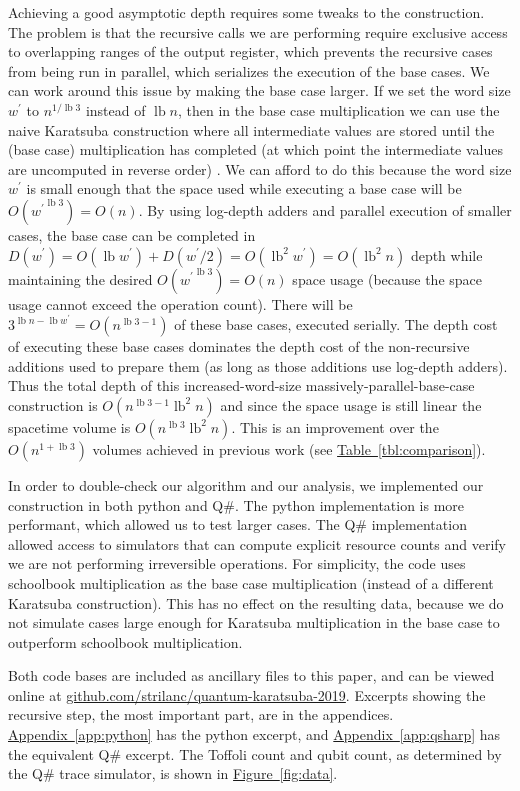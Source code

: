 \documentclass[onecolumn,unpublished]{quantumarticle}
\DeclareRobustCommand{\app}[1]{\hyperref[app:#1]{Appendix~\ref*{app:#1}}}
\newcommand{\fig}[1]{\hyperref[fig:#1]{Figure~\ref*{fig:#1}}}
\newcommand{\tbl}[1]{\hyperref[tbl:#1]{Table~\ref*{tbl:#1}}}
\def\lb{\operatorname{lb}}
\begin{document}
Achieving a good asymptotic depth requires some tweaks to the construction.
The problem is that the recursive calls we are performing require exclusive access to overlapping ranges of the output register, which prevents the recursive cases from being run in parallel, which serializes the execution of the base cases.
We can work around this issue by making the base case larger.
If we set the word size $w^\prime$ to $n^{1 / \lb 3}$ instead of $\lb n$, then in the base case multiplication we can use the naive Karatsuba construction where all intermediate values are stored until the (base case) multiplication has completed (at which point the intermediate values are uncomputed in reverse order) \cite{bennett1973logical}.
We can afford to do this because the word size $w^\prime$ is small enough that the space used while executing a base case will be $O({w^\prime}^{\lb 3}) = O(n)$.
By using log-depth adders and parallel execution of smaller cases, the base case can be completed in $D(w^\prime) = O(\lb w^\prime) + D(w^\prime/2) = O(\lb^2 w^\prime) = O(\lb^2 n)$ depth while maintaining the desired $O({w^\prime}^{\lb 3}) = O(n)$ space usage (because the space usage cannot exceed the operation count).
There will be $3^{\lb n - \lb w^\prime} = O(n^{\lb 3 - 1})$ of these base cases, executed serially.
The depth cost of executing these base cases dominates the depth cost of the non-recursive additions used to prepare them (as long as those additions use log-depth adders).
Thus the total depth of this increased-word-size massively-parallel-base-case construction is $O(n^{\lb 3 - 1} \lb^2 n)$ and since the space usage is still linear the spacetime volume is $O(n^{\lb 3} \lb^2 n)$.
This is an improvement over the $O(n^{1 + \lb 3})$ volumes achieved in previous work (see \tbl{comparison}).

In order to double-check our algorithm and our analysis, we implemented our construction in both python and Q\#.
The python implementation is more performant, which allowed us to test larger cases.
The Q\# implementation allowed access to simulators that can compute explicit resource counts and verify we are not performing irreversible operations.
For simplicity, the code uses schoolbook multiplication as the base case multiplication (instead of a different Karatsuba construction).
This has no effect on the resulting data, because we do not simulate cases large enough for Karatsuba multiplication in the base case to outperform schoolbook multiplication.

Both code bases are included as ancillary files to this paper, and can be viewed online at \href{https://github.com/strilanc/quantum-karatsuba-2019}{github.com/strilanc/quantum-karatsuba-2019}.
Excerpts showing the recursive step, the most important part, are in the appendices.
\app{python} has the python excerpt, and \app{qsharp} has the equivalent Q\# excerpt.
The Toffoli count and qubit count, as determined by the Q\# trace simulator, is shown in \fig{data}.
\end{document}
